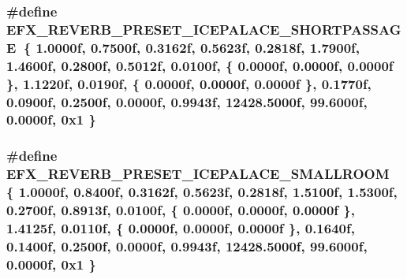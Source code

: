 \subsubsection[{\texorpdfstring{E\+F\+X\+\_\+\+R\+E\+V\+E\+R\+B\+\_\+\+P\+R\+E\+S\+E\+T\+\_\+\+I\+C\+E\+P\+A\+L\+A\+C\+E\+\_\+\+S\+H\+O\+R\+T\+P\+A\+S\+S\+A\+GE}{EFX_REVERB_PRESET_ICEPALACE_SHORTPASSAGE}}]{\setlength{\rightskip}{0pt plus 5cm}\#define E\+F\+X\+\_\+\+R\+E\+V\+E\+R\+B\+\_\+\+P\+R\+E\+S\+E\+T\+\_\+\+I\+C\+E\+P\+A\+L\+A\+C\+E\+\_\+\+S\+H\+O\+R\+T\+P\+A\+S\+S\+A\+GE~\{ 1.\+0000f, 0.\+7500f, 0.\+3162f, 0.\+5623f, 0.\+2818f, 1.\+7900f, 1.\+4600f, 0.\+2800f, 0.\+5012f, 0.\+0100f, \{ 0.\+0000f, 0.\+0000f, 0.\+0000f \}, 1.\+1220f, 0.\+0190f, \{ 0.\+0000f, 0.\+0000f, 0.\+0000f \}, 0.\+1770f, 0.\+0900f, 0.\+2500f, 0.\+0000f, 0.\+9943f, 12428.\+5000f, 99.\+6000f, 0.\+0000f, 0x1 \}}\hypertarget{efx-presets_8h_afccf8f45a932907098c4847c336a97f5}{}\label{efx-presets_8h_afccf8f45a932907098c4847c336a97f5}
\subsubsection[{\texorpdfstring{E\+F\+X\+\_\+\+R\+E\+V\+E\+R\+B\+\_\+\+P\+R\+E\+S\+E\+T\+\_\+\+I\+C\+E\+P\+A\+L\+A\+C\+E\+\_\+\+S\+M\+A\+L\+L\+R\+O\+OM}{EFX_REVERB_PRESET_ICEPALACE_SMALLROOM}}]{\setlength{\rightskip}{0pt plus 5cm}\#define E\+F\+X\+\_\+\+R\+E\+V\+E\+R\+B\+\_\+\+P\+R\+E\+S\+E\+T\+\_\+\+I\+C\+E\+P\+A\+L\+A\+C\+E\+\_\+\+S\+M\+A\+L\+L\+R\+O\+OM~\{ 1.\+0000f, 0.\+8400f, 0.\+3162f, 0.\+5623f, 0.\+2818f, 1.\+5100f, 1.\+5300f, 0.\+2700f, 0.\+8913f, 0.\+0100f, \{ 0.\+0000f, 0.\+0000f, 0.\+0000f \}, 1.\+4125f, 0.\+0110f, \{ 0.\+0000f, 0.\+0000f, 0.\+0000f \}, 0.\+1640f, 0.\+1400f, 0.\+2500f, 0.\+0000f, 0.\+9943f, 12428.\+5000f, 99.\+6000f, 0.\+0000f, 0x1 \}}\hypertarget{efx-presets_8h_a5873e650095207f32ba5618d48a17aa5}{}\label{efx-presets_8h_a5873e650095207f32ba5618d48a17aa5}
